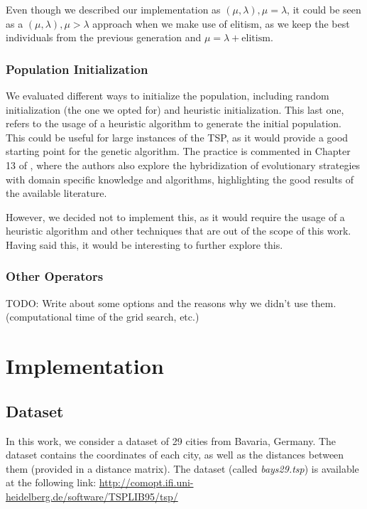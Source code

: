 \documentclass[12pt]{article}
\begin{document}
\begin{enumerate}
Even though we described our implementation as $(\mu,\lambda), \mu=\lambda$, it could be seen as a $(\mu,\lambda), \mu>\lambda$ approach when we make use of elitism, as we keep the best individuals from the previous generation and $\mu=\lambda+\text{elitism}$.


\subsubsection{Population Initialization}
We evaluated different ways to initialize the population, including random initialization (the one we opted for) and heuristic initialization. This last one, refers to the usage of a heuristic algorithm to generate the initial population. This could be useful for large instances of the TSP, as it would provide a good starting point for the genetic algorithm. The practice is commented in Chapter 13 of \cite{Back2000}, where the authors also explore the hybridization of evolutionary strategies with domain specific knowledge and algorithms, highlighting the good results of the available literature.

However, we decided not to implement this, as it would require the usage of a heuristic algorithm and other techniques that are out of the scope of this work. Having said this, it would be interesting to further explore this.

\subsubsection{Other Operators}
TODO: Write about some options and the reasons why we didn't use them. (computational time of the grid search, etc.)

\section{Implementation}
\subsection{Dataset}
In this work, we consider a dataset of 29 cities from Bavaria, Germany. The dataset contains the coordinates of each city, as well as the distances between them (provided in a distance matrix). The dataset (called \textit{bays29.tsp}) is available at the following link: \url{http://comopt.ifi.uni-heidelberg.de/software/TSPLIB95/tsp/}


\end{enumerate}
\end{document}
